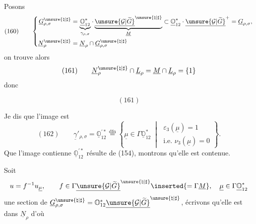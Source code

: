 Posons
\[
(160)\qquad\left\{
\begin{aligned}
\underline G_{\rho,\sigma}^{\unsure{\natural|\sharp}}
&=\underbrace{\underline{\mathbb O}_{12}^{*}}_{\gamma_{\rho,\sigma}}\cdot
\underbrace{\underline{\unsure{\mathcal G|\widetilde G}}^{\unsure{\natural|\sharp}}}_{\underline M}
\subset\underline{\mathbb O}_{12}^{*}\cdot\underline{\unsure{\mathcal G|\widetilde G}}^{+}
=\underline G_{\rho,\sigma},\\
\underline N_\rho^{\unsure{\natural|\sharp}}
&=\underline N_\rho\cap\underline G_{\rho,\sigma}^{\unsure{\natural|\sharp}}
\end{aligned}\right.
\]
on trouve alors
\[
(161)\qquad
\underline N_\rho^{\unsure{\natural|\sharp}}\cap\underline L_\rho
=\underline M\cap\underline L_\rho=\{1\}
\]
donc
\begin{samepage}
\[
(161)
\]
\end{samepage}
Je dis que l'image est
\[
(162)\qquad
\underline\gamma'_{\rho,\sigma}
=\underline{\mathbb O}_{12}^{\prime *}
\overset{\mathrm{dfn}}{=}
\left\{\underline\mu\in\Gamma\underline{\mathbb O}_{12}^{*}\;\middle|\;
\begin{gathered}\varepsilon_3(\underline\mu)=1\\\text{i.e. }\nu_3(\underline\mu)=0\end{gathered}\right\}.
\]
Que l'image contienne $\underline{\mathbb O}_{12}^{\prime *}$ résulte de (154), montrons qu'elle est contenue.

Soit
\[
u=f^{-1}u_{\underline\mu},\qquad
f\in\Gamma\underline{\unsure{\mathcal G|\widetilde G}}^{\unsure{\natural|\sharp}}\inserted{=\Gamma\underline M},\quad
\underline\mu\in\Gamma\underline{\mathbb O}_{12}^{*}
\]
une section  de
$\underline G_{\rho,\sigma}^{\unsure{\natural|\sharp}}
=\mathbb O_{12}^{*}\underline{\unsure{\mathcal G|\widetilde G}}^{\unsure{\natural|\sharp}}$,
écrivons qu'elle est dans $\underline N_\rho$ d'où


